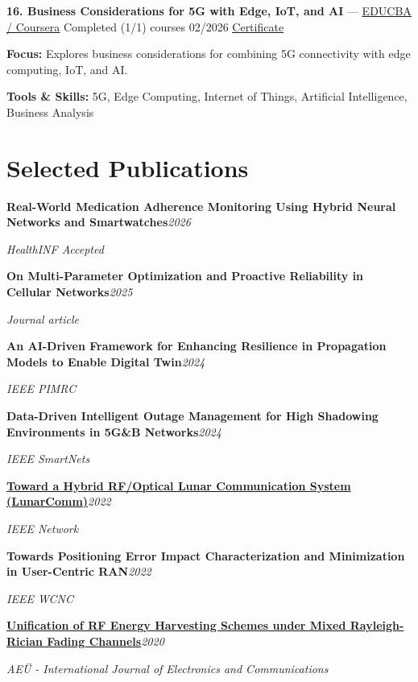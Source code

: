 \documentclass[9pt,letterpaper]{extarticle}
\newcommand{\entry}[2]{\Needspace{4\baselineskip}\textbf{#1}\hfill\textit{#2}\par}
\begin{document}
\vspace{2pt}
\noindent\textbf{16. Business Considerations for 5G with Edge, IoT, and AI} {\small --- \textcolor{blue}{\underline{\href{https://coursera.org/verify/SAUEVQXV5W71}{EDUCBA / Coursera}}} \textbar{} Completed (1/1) courses \textbar{} 02/2026 \textbar{} \textcolor{blue}{\underline{\href{https://waseemraza844.github.io/portfolio/certificates/wireless/bus-cons-5g.pdf}{Certificate}}}}\par
\textbf{Focus:} Explores business considerations for combining 5G connectivity with edge computing, IoT, and AI.\par
{\small\textbf{Tools \& Skills:} 5G, Edge Computing, Internet of Things, Artificial Intelligence, Business Analysis\par}
\vspace{2pt}
\section{Selected Publications}
\entry{Real-World Medication Adherence Monitoring Using Hybrid Neural Networks and Smartwatches}{2026}
\textit{HealthINF \textbar{} Accepted}\par
\entry{On Multi-Parameter Optimization and Proactive Reliability in Cellular Networks}{2025}
\textit{Journal article}\par
\entry{An AI-Driven Framework for Enhancing Resilience in Propagation Models to Enable Digital Twin}{2024}
\textit{IEEE PIMRC}\par
\entry{Data-Driven Intelligent Outage Management for High Shadowing Environments in 5G\&B Networks}{2024}
\textit{IEEE SmartNets}\par
\entry{\href{https://arxiv.org/abs/2203.15899}{Toward a Hybrid RF/Optical Lunar Communication System (LunarComm)}}{2022}
\textit{IEEE Network}\par
\entry{Towards Positioning Error Impact Characterization and Minimization in User-Centric RAN}{2022}
\textit{IEEE WCNC}\par
\entry{\href{https://doi.org/10.1016/j.aeue.2020.153244}{Unification of RF Energy Harvesting Schemes under Mixed Rayleigh-Rician Fading Channels}}{2020}
\textit{AEÜ - International Journal of Electronics and Communications}\par
\end{document}
